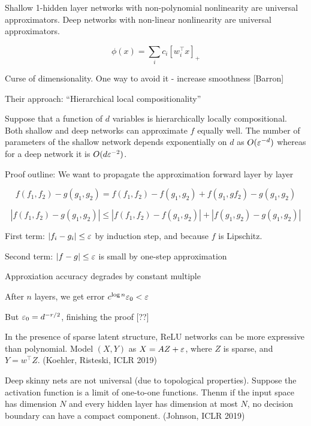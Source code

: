 \documentclass[english]{article}
\begin{document}
\begin{theorem} Shallow 1-hidden layer networks with non-polynomial nonlinearity are universal approximators. Deep networks with non-linear nonlinearity are universal approximators. 

$$\phi(x) = \sum_i c_i [w_i^\top x]_+$$
\end{theorem}

Curse of dimensionality. One way to avoid it - increase smoothness [Barron]

Their approach: ``Hierarchical local compositionality''

\begin{theorem}

Suppose that a function of $d$ variables is hierarchically locally compositional. Both shallow and deep networks can approximate $f$ equally well. The number of parameters of the shallow network depends exponentially on $d$ as $O(\varepsilon^{-d})$ whereas for a deep network it is $O(d\varepsilon^{-2})$.
\end{theorem}

Proof outline: We want to propagate the approximation forward layer by layer

$$f(f_1,f_2)-g(g_1,g_2) = f(f_1,f_2)-f(g_1,g_2)+f(g_1,gf_2)-g(g_1,g_2)$$

$$|f(f_1,f_2)-g(g_1,g_2)| \le| f(f_1,f_2)-f(g_1,g_2)|+|f(g_1,g_2)-g(g_1,g_2)|$$


First term: $|f_i-g_i| \le \varepsilon$ by induction step, and because $f$ is Lipschitz.

Second term: $|f-g| \le \varepsilon$ is small by one-step approximation

Approxiation accuracy degrades by constant multiple 

After $n$ layers, we get error $c^{\log n } \varepsilon_0 <\varepsilon$

But $\varepsilon_0 = d^{-r/2}$, finishing the proof [??]

\item In the presence of sparse latent structure, ReLU networks can be more expressive than polynomial. Model $(X,Y)$ as $X=AZ+\varepsilon$, where $Z$ is sparse, and $Y = w^\top Z$. (Koehler, Risteski, ICLR 2019)

\item Deep skinny nets are not universal (due to topological properties). Suppose the activation function is a limit of one-to-one functions. Thenm if the input space has dimension $N$ and every hidden layer has dimension at most $N$, no decision boundary can have a compact component. (Johnson, ICLR 2019)
\end{document}

